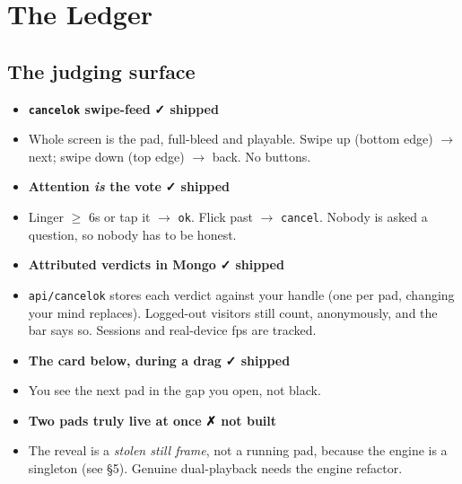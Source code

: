 \documentclass[10pt,letterpaper,twocolumn]{article}
\newcommand{\ok}{{\color{acgreen}\textbf{✓ shipped}}}
\newcommand{\nope}{{\color{acred}\textbf{✗ not built}}}
\begin{document}
\section{The Ledger}

\newcommand{\row}[2]{\item[] \textbf{#1} \hfill #2}

\subsection{The judging surface}
\begin{itemize}
  \row{\texttt{cancelok} swipe-feed}{\ok}
  \item Whole screen is the pad, full-bleed and playable. Swipe up (bottom edge) $\to$ next; swipe down (top edge) $\to$ back. No buttons.
  \row{Attention \emph{is} the vote}{\ok}
  \item Linger $\geq$ 6s or tap it $\to$ \texttt{ok}. Flick past $\to$ \texttt{cancel}. Nobody is asked a question, so nobody has to be honest.
  \row{Attributed verdicts in Mongo}{\ok}
  \item \texttt{api/cancelok} stores each verdict against your handle (one per pad, changing your mind replaces). Logged-out visitors still count, anonymously, and the bar says so. Sessions and real-device fps are tracked.
  \row{The card below, during a drag}{\ok}
  \item You see the next pad in the gap you open, not black.
  \row{Two pads truly live at once}{\nope}
  \item The reveal is a \emph{stolen still frame}, not a running pad, because the engine is a singleton (see \S5). Genuine dual-playback needs the engine refactor.
\end{itemize}
\end{document}
